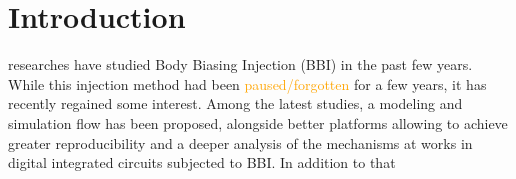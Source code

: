 
\section{Introduction}
 researches have studied Body Biasing Injection (BBI) in the past few years.
While this injection method had been \textcolor{orange}{paused/forgotten} for a few years, it has recently regained some interest.
Among the latest studies, a modeling and simulation flow has been proposed, alongside better platforms allowing to achieve greater reproducibility and a deeper analysis of the mechanisms at works in digital integrated circuits subjected to BBI.
In addition to that

